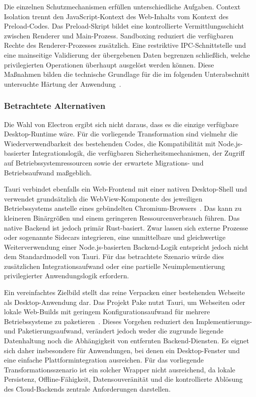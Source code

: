 Die einzelnen Schutzmechanismen erfüllen unterschiedliche Aufgaben.
Context Isolation trennt den JavaScript-Kontext des Web-Inhalts vom Kontext des Preload-Codes.
Das Preload-Skript bildet eine kontrollierte Vermittlungsschicht zwischen Renderer und Main-Prozess.
Sandboxing reduziert die verfügbaren Rechte des Renderer-Prozesses zusätzlich.
Eine restriktive IPC-Schnittstelle und eine mainseitige Validierung der übergebenen Daten begrenzen schließlich, welche privilegierten Operationen überhaupt ausgelöst werden können.
Diese Maßnahmen bilden die technische Grundlage für die im folgenden Unterabschnitt untersuchte Härtung der Anwendung~\cite{electron2026security,electron2026ipc}.

\subsubsection{Betrachtete Alternativen}
Die Wahl von Electron ergibt sich nicht daraus, dass es die einzige verfügbare Desktop-Runtime wäre.
Für die vorliegende Transformation sind vielmehr die Wiederverwendbarkeit des bestehenden Codes, die Kompatibilität mit Node.js-basierter Integrationslogik, die verfügbaren Sicherheitsmechanismen, der Zugriff auf Betriebssystemressourcen sowie der erwartete Migrations- und Betriebsaufwand maßgeblich.

Tauri verbindet ebenfalls ein Web-Frontend mit einer nativen Desktop-Shell und verwendet grundsätzlich die WebView-Komponente des jeweiligen Betriebssystems anstelle eines gebündelten Chromium-Browsers~\cite{tauri2026docs}.
Das kann zu kleineren Binärgrößen und einem geringeren Ressourcenverbrauch führen.
Das native Backend ist jedoch primär Rust-basiert.
Zwar lassen sich externe Prozesse oder sogenannte Sidecars integrieren, eine unmittelbare und gleichwertige Weiterverwendung einer Node.js-basierten Backend-Logik entspricht jedoch nicht dem Standardmodell von Tauri.
Für das betrachtete Szenario würde dies zusätzlichen Integrationsaufwand oder eine partielle Neuimplementierung privilegierter Anwendungslogik erfordern.

Ein vereinfachtes Zielbild stellt das reine Verpacken einer bestehenden Webseite als Desktop-Anwendung dar.
Das Projekt Pake nutzt Tauri, um Webseiten oder lokale Web-Builds mit geringem Konfigurationsaufwand für mehrere Betriebssysteme zu paketieren~\cite{pake2026github}.
Dieses Vorgehen reduziert den Implementierungs- und Paketierungsaufwand, verändert jedoch weder die zugrunde liegende Datenhaltung noch die Abhängigkeit von entfernten Backend-Diensten.
Es eignet sich daher insbesondere für Anwendungen, bei denen ein Desktop-Fenster und eine einfache Plattformintegration ausreichen.
Für das vorliegende Transformationsszenario ist ein solcher Wrapper nicht ausreichend, da lokale Persistenz, Offline-Fähigkeit, Datensouveränität und die kontrollierte Ablösung des Cloud-Backends zentrale Anforderungen darstellen.

